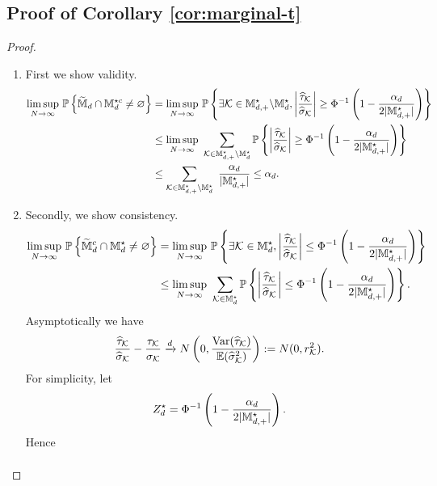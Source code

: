 \documentclass[12pt]{article}
\begin{document}
\subsection{Proof of Corollary \ref{cor:marginal-t}}
\begin{proof}
\begin{enumerate}
    \item First we show validity. 
    \begin{align*}
        \underset{N\to\infty}{\lim\sup}~{\mathbb{P}}\left\{\widetilde{{\mathbb{M}}}_{d}\cap{\mathbb{M}}^{\star c}_d\neq \varnothing\right\} 
        &= \underset{N\to\infty}{\lim\sup}~{\mathbb{P}}\left\{\exists {\mathcal{K}}\in{\mathbb{M}}^{\star }_{d,+}\backslash{\mathbb{M}}^{\star }_{d}, \left|\frac{{\widehat{\tau}}_{{\mathcal{K}}}}{\widehat{\sigma}_{\mathcal{K}}}\right|\ge\Phi^{-1}\left(1-\frac{\alpha_d}{2|{\mathbb{M}}^{\star }_{d,+}|} \right)\right\}\\
        &\le\underset{N\to\infty}{\lim\sup}~ \sum_{{\mathcal{K}}\in{\mathbb{M}}^{\star }_{d,+}\backslash{\mathbb{M}}^{\star }_{d}} {\mathbb{P}}\left\{\left|\frac{{\widehat{\tau}}_{{\mathcal{K}}}}{\widehat{\sigma}_{\mathcal{K}}}\right|\ge\Phi^{-1}\left(1-\frac{\alpha_d}{2|{\mathbb{M}}^{\star }_{d,+}|} \right)\right\}\\
        &\le \sum_{{\mathcal{K}}\in{\mathbb{M}}^{\star }_{d,+}\backslash{\mathbb{M}}^{\star }_{d}} ~\frac{\alpha_d}{|{\mathbb{M}}^{\star }_{d,+}|} \le \alpha_d.
    \end{align*}
    \item Secondly, we show consistency.
    \begin{align*}
        \underset{N\to\infty}{\lim\sup}~{\mathbb{P}}\left\{\widetilde{{\mathbb{M}}}^c_{d}\cap{\mathbb{M}}^{\star }_d\neq \varnothing\right\} 
        &= \underset{N\to\infty}{\lim\sup}~{\mathbb{P}}\left\{\exists {\mathcal{K}}\in {\mathbb{M}}^{\star }_{d}, \left|\frac{{\widehat{\tau}}_{{\mathcal{K}}}}{\widehat{\sigma}_{\mathcal{K}}}\right|\le\Phi^{-1}\left(1-\frac{\alpha_d}{2|{\mathbb{M}}^{\star }_{d,+}|} \right)\right\}\\
        &\le\underset{N\to\infty}{\lim\sup}~ \sum_{{\mathcal{K}}\in{\mathbb{M}}^{\star }_{d}} {\mathbb{P}}\left\{\left|\frac{{\widehat{\tau}}_{{\mathcal{K}}}}{\widehat{\sigma}_{\mathcal{K}}}\right|\le\Phi^{-1}\left(1-\frac{\alpha_d}{2|{\mathbb{M}}^{\star }_{d,+}|} \right)\right\}.
    \end{align*}
    Asymptotically we have
    \begin{align*}
        \frac{{\widehat{\tau}}_{{\mathcal{K}}}}{\widehat{\sigma}_{\mathcal{K}}} - \frac{\tau_{\mathcal{K}}}{\sigma_{\mathcal{K}}} \xrightarrow{d} N\left(0,\frac{\operatorname{Var}({\widehat{\tau}}_{\mathcal{K}})}{{\mathbb{E}}(\widehat{\sigma}^2_{\mathcal{K}})}\right) : = N(0,r_{\mathcal{K}}^2).
    \end{align*}
    For simplicity, let
    \begin{align*}
        Z_d^\star = \Phi^{-1}\left(1-\frac{\alpha_d}{2|{\mathbb{M}}^{\star }_{d,+}|} \right). 
    \end{align*}
    Hence
    \begin{align}

\end{align}
\end{enumerate}
\end{proof}
\end{document}
